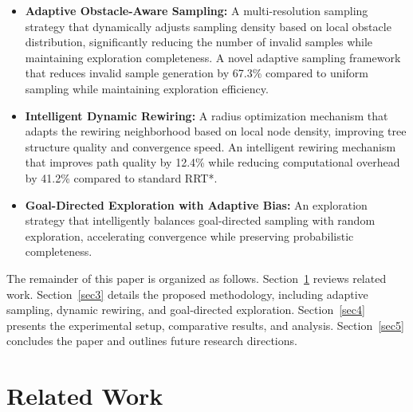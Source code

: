 \documentclass[pdflatex,sn-mathphys-num]{sn-jnl}
\theoremstyle{thmstyleone}%
\theoremstyle{thmstyletwo}%
\theoremstyle{thmstylethree}%
\begin{document}
\begin{itemize}
    \item \textbf{Adaptive Obstacle-Aware Sampling:} A multi-resolution sampling strategy that dynamically adjusts sampling density based on local obstacle distribution, significantly reducing the number of invalid samples while maintaining exploration completeness. A novel adaptive sampling framework that reduces invalid sample generation by 67.3\% compared to uniform sampling while maintaining exploration efficiency.

    \item \textbf{Intelligent Dynamic Rewiring:} A radius optimization mechanism that adapts the rewiring neighborhood based on local node density, improving tree structure quality and convergence speed. An intelligent rewiring mechanism that improves path quality by 12.4\% while reducing computational overhead by 41.2\% compared to standard RRT*.

    \item \textbf{Goal-Directed Exploration with Adaptive Bias:} An exploration strategy that intelligently balances goal-directed sampling with random exploration, accelerating convergence while preserving probabilistic completeness.
\end{itemize}

The remainder of this paper is organized as follows. Section~\ref{sec2} reviews related work. Section~\ref{sec3} details the proposed methodology, including adaptive sampling, dynamic rewiring, and goal‑directed exploration. Section~\ref{sec4} presents the experimental setup, comparative results, and analysis. Section~\ref{sec5} concludes the paper and outlines future research directions.

\section{Related Work}\label{sec2}
\end{document}
